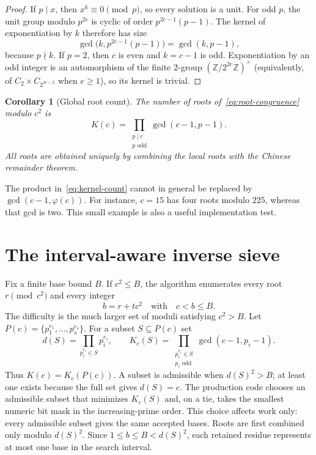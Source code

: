 \documentclass[11pt]{article}
\newtheorem{corollary}[theorem]{Corollary}
\newcommand{\Z}{\mathbb{Z}}
\begin{document}
\begin{proof}
If $p\mid x$, then $x^k\equiv0\pmod p$, so every solution is a unit.
For odd $p$, the unit group modulo $p^{2e}$ is cyclic of order
$p^{2e-1}(p-1)$.  The kernel of exponentiation by $k$ therefore has size
\[
 \gcd\bigl(k,p^{2e-1}(p-1)\bigr)=\gcd(k,p-1),
\]
because $p\nmid k$.  If $p=2$, then $c$ is even and $k=c-1$ is odd.
Exponentiation by an odd integer is an automorphism of the finite $2$-group
$(\Z/2^{2e}\Z)^\times$ (equivalently, of
$C_2\times C_{2^{2e-2}}$ when $e\geq1$), so its kernel is trivial.
\end{proof}

\begin{corollary}[Global root count]\label{cor:global-count}
The number of roots of~\eqref{eq:root-congruence} modulo $c^2$ is
\begin{equation}\label{eq:kernel-count}
 K(c)=\prod_{\substack{p\mid c\\p\text{ odd}}}\gcd(c-1,p-1).
\end{equation}
All roots are obtained uniquely by combining the local roots with the Chinese
remainder theorem.
\end{corollary}

The product in~\eqref{eq:kernel-count} cannot in general be replaced by
$\gcd(c-1,\varphi(c))$.  For instance, $c=15$ has four roots modulo $225$,
whereas that gcd is two.  This small example is also a useful implementation
test.

\section{The interval-aware inverse sieve}

Fix a finite base bound $B$.  If $c^2\leq B$, the algorithm enumerates every
root $r\pmod{c^2}$ and every integer
\[
 b=r+t c^2\quad\text{with}\quad c<b\leq B.
\]
The difficulty is the much larger set of moduli satisfying $c^2>B$.  Let
$P(c)=\{p_1^{e_1},\ldots,p_s^{e_s}\}$.  For a subset $S\subseteq P(c)$ set
\[
 d(S)=\prod_{p_i^{e_i}\in S}p_i^{e_i},\qquad
 K_c(S)=\prod_{\substack{p_i^{e_i}\in S\\p_i\text{ odd}}}
              \gcd(c-1,p_i-1).
\]
Thus $K(c)=K_c(P(c))$.
A subset is admissible when $d(S)^2>B$; at least one exists because the full
set gives $d(S)=c$.  The production code chooses an admissible subset that
minimizes $K_c(S)$ and, on a tie, takes the smallest numeric bit mask in the
increasing-prime order.  This choice affects work only: every admissible
subset gives the same accepted bases.  Roots are first combined only modulo
$d(S)^2$.  Since $1\leq b\leq B<d(S)^2$, each retained residue represents at
most one base in the search interval.
\end{document}
